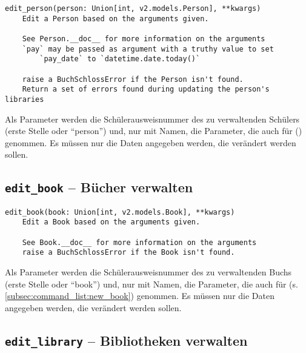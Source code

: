 \begin{verbatim}
edit_person(person: Union[int, v2.models.Person], **kwargs)
    Edit a Person based on the arguments given.

    See Person.__doc__ for more information on the arguments
    `pay` may be passed as argument with a truthy value to set
        `pay_date` to `datetime.date.today()`

    raise a BuchSchlossError if the Person isn't found.
    Return a set of errors found during updating the person's libraries
\end{verbatim}

Als Parameter werden die Schülerausweisnummer des zu verwaltenden Schülers (erste Stelle oder ``person'') und, nur mit Namen, die Parameter, die auch für  () genommen. Es müssen nur die Daten angegeben werden, die verändert werden sollen.

\subsection{\texttt{edit\_book} -- Bücher verwalten}
\label{subsec:command_list:edit_book}

\begin{verbatim}
edit_book(book: Union[int, v2.models.Book], **kwargs)
    Edit a Book based on the arguments given. 

    See Book.__doc__ for more information on the arguments
    raise a BuchSchlossError if the Book isn't found.
\end{verbatim}

Als Parameter werden die Schülerausweisnummer des zu verwaltenden Buchs (erste Stelle oder ``book'') und, nur mit Namen, die Parameter, die auch für  (s. \ref{subsec:command_list:new_book}) genommen. Es müssen nur die Daten angegeben werden, die verändert werden sollen.

\subsection{\texttt{edit\_library} -- Bibliotheken verwalten}
\label{subsec:command_list:edit_library}

